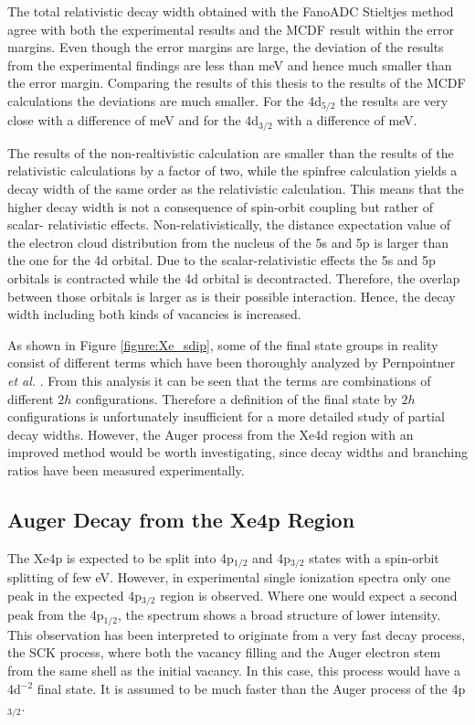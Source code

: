 The total relativistic decay width obtained with the FanoADC
Stieltjes method agree with
both the experimental results and the \ac{MCDF} result within the error margins.
Even though the error margins are large, the deviation of the results
from the experimental findings are
less than \unit[52]{meV} and hence much smaller than the error margin. 
Comparing the results of this thesis to the results of the \ac{MCDF} calculations
the deviations are much smaller. For the 4d$_{5/2}$
the results are very close with a difference of \unit[2]{meV} and for the
4d$_{3/2}$ with a difference of \unit[10]{meV}.

The results of the non-realtivistic calculation are smaller than the
results of the relativistic calculations by a factor of two,
while the spinfree calculation yields a decay width
of the same order as the relativistic calculation. This means that the higher
decay width is not a consequence of spin-orbit coupling but rather of scalar-
relativistic effects. Non-relativistically, the distance expectation value
of the electron cloud distribution
from the nucleus of the 5s and 5p is larger than the one for the 4d orbital. Due to
the scalar-relativistic effects the 5s and 5p orbitals is contracted while the 4d
orbital is decontracted. Therefore, the overlap between those orbitals is larger
as is their possible interaction. Hence, the decay width including both
kinds of vacancies is increased.

As shown in Figure \ref{figure:Xe_sdip}, some of the final state groups
in reality consist of
different terms which have been thoroughly analyzed by
Pernpointner \textit{et al.} \cite{Pernpointner12_2}. From this analysis
it can be seen that the terms are combinations of different $2h$
configurations. Therefore a definition of the final state by $2h$
configurations is unfortunately insufficient for a more detailed
study of partial decay widths.
However, the Auger process from the Xe4d region with an improved method
would be worth investigating, since decay widths and branching ratios have been
measured experimentally. \cite{Aksela94}




\subsection{Auger Decay from the Xe4p Region}
The Xe4p is expected to be split into 4p$_{1/2}$ and 4p$_{3/2}$ states with
a spin-orbit splitting of few \unit{eV}. However, in experimental single
ionization spectra only one peak in the expected 4p$_{3/2}$ region is observed.
Where one would expect a second peak from the 4p$_{1/2}$, the spectrum shows
a broad structure of lower intensity. This observation has been interpreted
to originate from a very fast decay process, the \ac{SCK} process, where both the
vacancy filling and the Auger electron stem from the same shell as the initial
vacancy. In this case, this process would have a 4d$^{-2}$ final state.
It is assumed to be much faster than the Auger process
of the 4p$_{3/2}$. 

